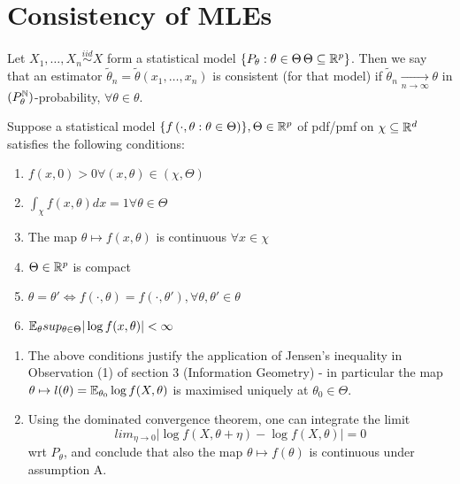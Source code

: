\documentclass[a4paper]{article}
\begin{document}
\section{Consistency of MLEs}

\begin{defn}
	Let $X_1, \ldots, X_n \stackrel{iid}{\sim} X$ form a statistical model $\{P_{\theta} : \theta \in \Theta\, \Theta \subseteq \mathbb{R}^{p}\}$. Then we say that an estimator $\tilde{\theta}_{n} = \tilde{\theta}(x_1, \ldots, x_n)$ is consistent (for that model) if $\tilde{\theta}_n \underset{n\to \infty}{\to} \theta$ in $(P_\theta^{\mathbb{N}})$-probability, $\forall \theta \in \theta$.
\end{defn}

\begin{assumption}
	Suppose a statistical model $\{f\left( \cdot , \theta : \theta \in \Theta \right) \}, \Theta \in \mathbb{R}^{p}$ of pdf/pmf on $\chi \subseteq \mathbb{R}^{d}$ satisfies the following conditions:

\begin{enumerate}
	\item $f(x,0) > 0 \forall (x, \theta) \in  (\chi, \Theta)$
	\item $\int_{\chi} f(x,\theta) dx = 1 \forall \theta \in \Theta$
	\item The map $\theta \mapsto f(x, \theta)$ is continuous $\forall x \in  \chi$
	\item  $\Theta \in \mathbb{R}^{p}$ is compact
	\item $\theta = \theta' \iff f(\cdot , \theta) = f(\cdot , \theta'), \forall \theta, \theta' \in \theta $
	\item $\mathbb{E}_{\theta} sup_{\theta \in \Theta} |\log f(x, \theta)| < \infty$
\end{enumerate}

\end{assumption}

\begin{remark}
	\begin{enumerate}
		\item The above conditions justify the application of Jensen's inequality in Observation (1) of section 3 (Information Geometry) - in particular the map $ \theta \mapsto l(\theta) = \mathbb{E}_{\theta_0} \log f(X, \theta)$ is maximised uniquely at $\theta_0 \in \Theta$.
		\item Using the dominated convergence theorem, one can integrate the limit
			\[
				lim_{\eta \to  0} |\log f(X, \theta + \eta) - \log f(X, \theta)| = 0
			\] wrt $P_\theta$, and conclude that also the map $\theta \mapsto f(\theta)$ is continuous under assumption A.
	\end{enumerate}
\end{remark}
\end{document}
